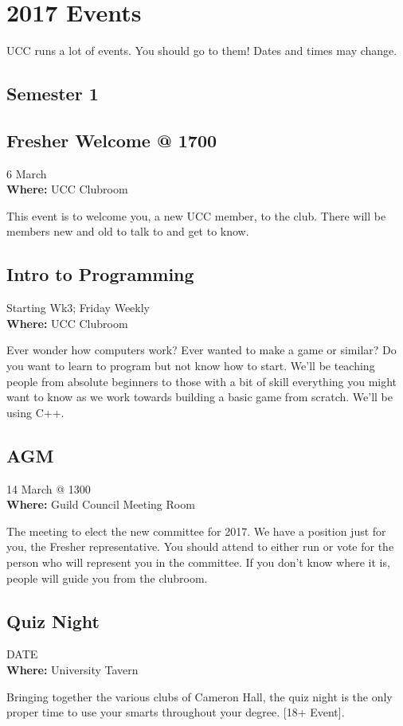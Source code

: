 \chapter{2017 Events}

UCC runs a lot of events. You should go to them! Dates and times may change. 

\newenvironment{event}[3]
{
	\begin{mdframed}[backgroundcolor=white,nobreak=true]
		\color{black}{\section{#1}}
		\begin{mdframed}[backgroundcolor=white]
			When: #2
			Where: #3
		\end{mdframed}
}{
	\end{mdframed}
}

\renewenvironment{event}[3]
{
	\section{#1}
	 #2 \\
	{\bf Where:} #3

}{}

\section{Semester 1}
	
	\begin{event}{Fresher Welcome @ 1700}{6 March}{UCC Clubroom}
		This event is to welcome you, a new UCC member, to the club. There will be members new and old to talk to and get to know.
	\end{event}
	
	\begin{event}{Intro to Programming}{Starting Wk3; Friday Weekly}{UCC Clubroom}
		Ever wonder how computers work? Ever wanted to make a game or similar? Do you want to learn to program but not know how to start. We'll be teaching people from absolute beginners to those with a bit of skill everything you might want to know as we work towards building a basic game from scratch. We'll be using C++.
	\end{event}
	
	\begin{event}{AGM}{14 March @ 1300}{Guild Council Meeting Room}
		The meeting to elect the new committee for 2017. We have a position just for you, the Fresher representative. You should attend to either run or vote for the person who will represent you in the committee. If you don't know where it is, people will guide you from the clubroom.
	\end{event}
	\begin{event}{Quiz Night}{DATE}{University Tavern}
		Bringing together the various clubs of Cameron Hall, the quiz night is the only proper time to use your smarts throughout your degree.  [18+ Event].
	\end{event}
	
